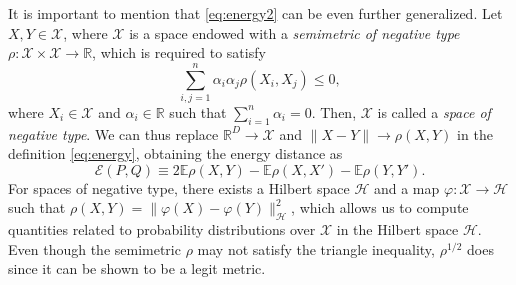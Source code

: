 \documentclass[aps,preprint,nofootinbib,floatfix]{revtex4-1}
\newcommand\Energy{\mathcal{E}}
\newcommand\E{\mathbb{E}}
\begin{document}
It is important to 
mention that \eqref{eq:energy2} can be even further generalized.
Let $X, Y \in \mathcal{X}$,  where $\mathcal{X}$ is a space endowed
with a \emph{semimetric of negative type}
$\rho: \mathcal{X}\times\mathcal{X} \to \mathbb{R}$, which is required
to satisfy
\begin{equation}
\label{eq:negative_type}
\sum_{i,j=1}^n \alpha_i \alpha_j \rho(X_i, X_j) \le 0,
\end{equation}
where $X_i \in \mathcal{X}$ and $\alpha_i \in \mathbb{R}$ such that
$\sum_{i=1}^n \alpha_i = 0$. Then, $\mathcal{X}$ is called a \emph{space of
negative type}.
We can thus replace $\mathbb{R}^D \to \mathcal{X}$ and 
$\| X - Y \| \to \rho(X , Y)$ in the definition \eqref{eq:energy}, obtaining
the energy distance as
\begin{equation}
\label{eq:energy3}
\Energy(P, Q) \equiv 2 \E \rho(X,Y) - \E \rho(X, X') - \E \rho(Y,Y').
\end{equation}
For spaces of negative type, there exists a Hilbert space $\mathcal{H}$ and
a map $\varphi: \mathcal{X} \to
\mathcal{H}$ such that
$\rho(X, Y) = \| \varphi(X) - \varphi(Y) \|_{\mathcal{H}}^2$, which
allows us to compute quantities related to probability distributions over
$\mathcal{X}$ in the Hilbert space $\mathcal{H}$.
Even though the semimetric 
$\rho$ may not satisfy the triangle inequality, 
$\rho^{1/2}$ does since it can be shown to be a legit metric. 
\end{document}
